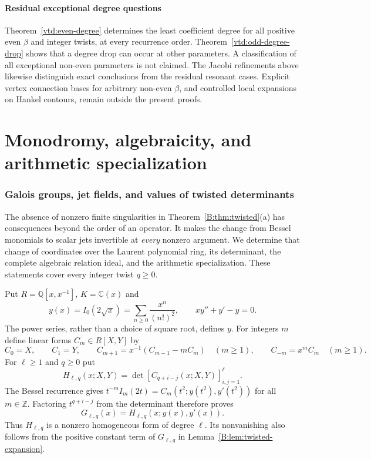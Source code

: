 \documentclass[11pt,a4paper]{article}
\theoremstyle{definition}
\theoremstyle{remark}
\numberwithin{equation}{section}
\begin{document}
\subsection{Residual exceptional degree questions}
Theorem~\ref{vtd:even-degree} determines the least coefficient degree
for all positive even $\beta$ and integer twists, at every recurrence
order. Theorem~\ref{vtd:odd-degree-drop} shows that a degree drop can
occur at other parameters. A classification of all exceptional
non-even parameters is not claimed. The Jacobi refinements above
likewise distinguish exact conclusions from the residual resonant
cases. Explicit vertex connection bases for arbitrary non-even
$\beta$, and controlled local expansions on Hankel contours, remain
outside the present proofs.


\clearpage\part{Monodromy, algebraicity, and arithmetic specialization}

\section{Galois groups, jet fields, and values of twisted determinants}
\label{B:bv:section}

The absence of nonzero finite singularities in
Theorem~\ref{B:thm:twisted}(a) has consequences beyond the order of an
operator. It makes the change from Bessel monomials to scalar jets
invertible at \emph{every} nonzero argument. We determine that change
of coordinates over the Laurent polynomial ring, its determinant, the
complete algebraic relation ideal, and the arithmetic specialization.
These statements cover every integer twist $q\ge0$.

Put $R=\mathbb Q[x,x^{-1}]$, $K=\mathbb C(x)$ and
\[
 y(x)=I_0(2\sqrt{x})=\sum_{n\ge0}\frac{x^n}{(n!)^2},
 \qquad xy''+y'-y=0.
\]
The power series, rather than a choice of square root, defines $y$.
For integers $m$ define linear forms $C_m\in R[X,Y]$ by
\begin{equation}\label{B:bv:forms}
 C_0=X,\qquad C_1=Y,\qquad
 C_{m+1}=x^{-1}(C_{m-1}-mC_m)\quad(m\ge1),
 \qquad C_{-m}=x^mC_m\quad(m\ge1).
\end{equation}
For $\ell\ge1$ and $q\ge0$ put
\begin{equation}\label{B:bv:H}
 H_{\ell,q}(x;X,Y)=\det[C_{q+i-j}(x;X,Y)]_{i,j=1}^{\ell}.
\end{equation}
The Bessel recurrence gives
$t^{-m}I_m(2t)=C_m(t^2;y(t^2),y'(t^2))$ for all $m\in\mathbb Z$.
Factoring $t^{q+i-j}$ from the determinant therefore proves
\begin{equation}\label{B:bv:representation}
 G_{\ell,q}(x)=H_{\ell,q}(x;y(x),y'(x)).
\end{equation}
Thus $H_{\ell,q}$ is a nonzero homogeneous form of degree $\ell$.
Its nonvanishing also follows from the positive constant term of
$G_{\ell,q}$ in Lemma~\ref{B:lem:twisted-expansion}.
\end{document}
